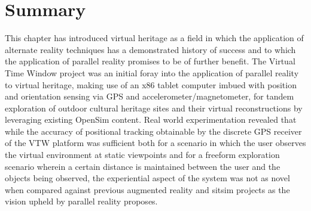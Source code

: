 \section{Summary}

This chapter has introduced virtual heritage as a field in which the application of alternate reality techniques has a demonstrated history of success and to which the application of parallel reality promises to be of further benefit. The Virtual Time Window project was an initial foray into the application of parallel reality to virtual heritage, making use of an x86 tablet computer imbued with position and orientation sensing via GPS and accelerometer/magnetometer, for tandem exploration of outdoor cultural heritage sites and their virtual reconstructions by leveraging existing OpenSim content. Real world experimentation revealed that while the accuracy of positional tracking obtainable by the discrete GPS receiver of the VTW platform was sufficient both for a scenario in which the user observes the virtual environment at static viewpoints and for a freeform exploration scenario wherein a certain distance is maintained between the user and the objects being observed, the experiential aspect of the system was not as novel when compared against previous augmented reality and sitsim projects as the vision upheld by parallel reality proposes.

